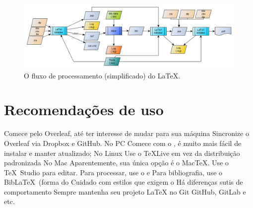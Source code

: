 \begin{figure}[hbt]
    \centering
    \includegraphics[width=0.8\linewidth]{"Images/LaTeX processing flow"}
    \caption{O fluxo de processamento (simplificado) do \LaTeX.}
    \label{fig:latex-processing-flow}
\end{figure}

\section{Recomendações de uso}

    \begin{outline}
    \1 Comece pelo Overleaf, até ter interesse de mudar para sua máquina
    \1 Sincronize o Overleaf via Dropbox e GitHub. 
    \1 No PC
    \2 Comece com o , é muito mais fácil de instalar e manter
    atualizado;
    \1 No Linux
    \2 Use o \TeX  Live em vez da distribuição padronizada
    \1 No Mac
    \2 Aparentemente, sua única opção é o Mac\TeX.
    \1 Use o \TeX\ Studio para editar.
    \1 Para processar, use o  e 
    \1 Para bibliografia, use o Bib\LaTeX\ (forma do  
    \2 Cuidado com estilos que exigem o 
    \2 Há diferenças sutis de comportamento
    \1 Sempre mantenha seu projeto \LaTeX{}  no Git
    \2 GitHub, GitLab e etc.
\end{outline}

